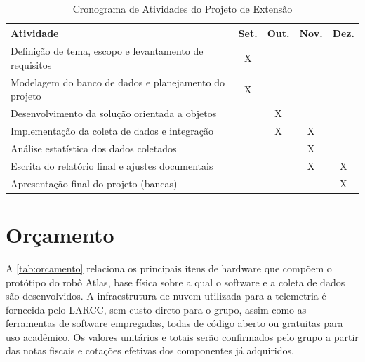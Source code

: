 \begin{table}[htb]
\centering
\caption{Cronograma de Atividades do Projeto de Extensão}
\label{tab:cronograma}
\begin{tabular}{|p{7.5cm}|c|c|c|c|}
\hline
\textbf{Atividade} & \textbf{Set.} & \textbf{Out.} & \textbf{Nov.} & \textbf{Dez.} \\ \hline
Definição de tema, escopo e levantamento de requisitos & X & & & \\ \hline
Modelagem do banco de dados e planejamento do projeto & X & & & \\ \hline
Desenvolvimento da solução orientada a objetos & & X & & \\ \hline
Implementação da coleta de dados e integração & & X & X & \\ \hline
Análise estatística dos dados coletados & & & X & \\ \hline
Escrita do relatório final e ajustes documentais & & & X & X \\ \hline
Apresentação final do projeto (bancas) & & & & X \\ \hline
\end{tabular}
\end{table}

\section{Orçamento} \label{sec:budget}
A \autoref{tab:orcamento} relaciona os principais itens de hardware que compõem o protótipo do robô Atlas, base física sobre a qual o software e a coleta de dados são desenvolvidos. A infraestrutura de nuvem utilizada para a telemetria é fornecida pelo LARCC, sem custo direto para o grupo, assim como as ferramentas de software empregadas, todas de código aberto ou gratuitas para uso acadêmico. Os valores unitários e totais serão confirmados pelo grupo a partir das notas fiscais e cotações efetivas dos componentes já adquiridos.

